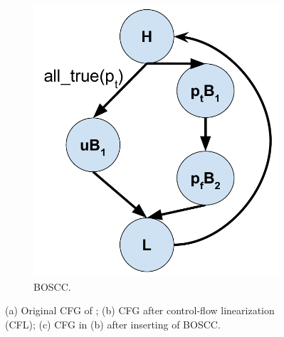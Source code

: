 \begin{figure}
\begin{subfigure}[b]{0.49\textwidth}
         \includegraphics[width=\textwidth, height=.33\textheight]{Figures/02-background/simple-loop-bossc-cfg.pdf}
         \caption{BOSCC.}
         \label{fig:simple-loop-boscc-cfg}
     \end{subfigure}
        \caption{(a) Original CFG of ; (b) CFG after control-flow linearization (CFL); (c) CFG in (b) after inserting of  BOSCC.}
        \label{fig:simple-loop-cfgs}
\end{figure}

